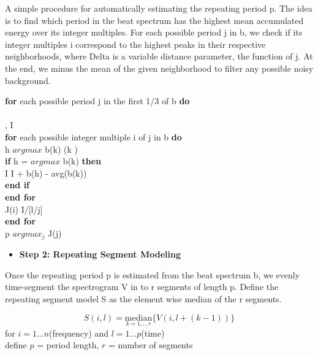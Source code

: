 \documentclass[journal,onecolumn, draftclsnofoot, 12pt]{IEEEtran}
\begin{document}
\begin{description}
   A simple procedure for automatically estimating the repeating period p. The idea is to find which period in the beat spectrum has the highest mean accumulated energy over its integer multiples. For each possible period j in b, we check if its integer multiples i correspond to the highest peaks in their respective neighborhoods, where Delta is a variable distance parameter, the function of j. At the end, we minus the mean of the given neighborhood to filter any possible noisy background.
\end{description}
         \textbf{for} each possible period j in the first 1/3 of b \textbf{do}
         \\
        \\
        \Delta \leftarrow [3j/4], I 
        \\
         \textbf{for} each possible integer multiple i of j in b \textbf{do}
         \\
         h \leftarrow $argmax$ b(k)   (k )
         \\
         \textbf{if} h = $argmax$ b(k) \textbf{then}
         \\
         I \leftarrow I + b(h) - avg(b(k))
         \\
         \textbf{end if}
         \\
         \textbf{end for}
         \\
         J(i) \leftarrow I/[l/j]
         \\
         \textbf{end for}
         \\
         p \leftarrow $argmax_{j}$ J(j) 

\vspace{0.5cm}
\begin{itemize}
    \item \textbf{Step 2: Repeating Segment Modeling} 
\end{itemize}
\begin{description}
   Once the repeating period p is estimated from the beat spectrum b, we evenly time-segment the spectrogram V in to r segments of length p. Define the repeating segment model S as the element wise median of the r segments.   
\end{description}

    \[S(i,l) = \underset{k=1,,,r}{\mathrm{median}} \{V(i,l+(k-1))\}\]
    for \(i= 1 \dots n\)(frequency) and \(l = 1 \dots p\)(time)
    \centering
    \\
    define \(p\) = period length, \(r\) = number of segments
    \centering
    
\end{document}
